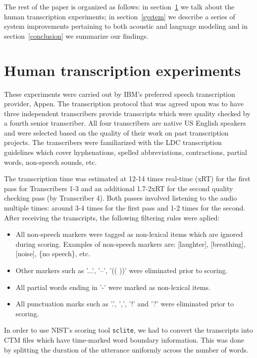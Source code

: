 \documentclass[a4paper]{article}
\begin{document}
The rest of the paper is organized as follows: in section~\ref{human} we talk about
the human transcription experiments; in section~\ref{system}
we describe a series of system improvements pertaining to both
acoustic and language modeling and in section~\ref{conclusion} we
summarize our findings.

\section{Human transcription experiments}
\label{human}

These experiments were carried out by IBM's preferred speech
transcription provider, Appen. The transcription protocol that was
agreed upon was to have three independent transcribers provide
transcripts which were quality checked by a fourth senior transcriber.
All four transcribers are native US English speakers and were selected
based on the quality of their work on past transcription projects. The
transcribers were familiarized with the LDC transcription guidelines
which cover hyphenations, spelled abbreviations, contractions, partial
words, non-speech sounds, etc.

The transcription time was estimated at 12-14 times real-time (xRT) for the first pass for
Transcribers 1-3 and an additional 1.7-2xRT for the second quality
checking pass (by Transcriber 4). Both passes involved listening to the
audio multiple times: around 3-4 times for the first pass and 1-2 times for
the second. After receiving the transcripts, the following filtering
rules were aplied:

\begin{itemize}
\item All non-speech markers were tagged as non-lexical items which are ignored during scoring. Examples of non-speech markers are: [laughter], [breathing], [noise], \{no speech\}, etc.
\item Other markers such as '...', '--', '(( ))' were eliminated prior to scoring. 
\item All partial words ending in '-' were marked as non-lexical items.
\item All punctuation marks such as '.', ',', '!' and '?' were eliminated prior to scoring.
\end{itemize}

In order to use NIST's scoring tool {\tt sclite}, we had to convert
the transcripts into CTM files which have time-marked word boundary
information. This was done by splitting the duration of the utterance
uniformly across the number of words. 
\end{document}
